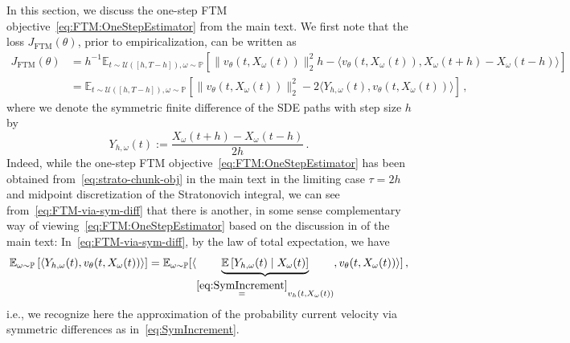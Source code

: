 \documentclass[oneside,11pt]{article}
\theoremstyle{remark}
\begin{document}
In this section, we discuss the one-step FTM objective~\eqref{eq:FTM:OneStepEstimator} from the main text. We first note that the loss $J_{\text{FTM}}(\theta)$, prior to empiricalization, can be written as
\begin{align}
    J_{\text{FTM}}(\theta) &= h^{-1} \mathbb{E}_{t \sim \mathcal{U}([h, T-h]), \omega \sim \mathbb{P}} \left[\|v_{\theta}(t, X_\omega(t))\|_2^2 h - \langle v_{\theta}(t,X_\omega(t)), X_\omega(t+h) - X_\omega(t-h)\rangle \right] \nonumber\\
    &= \mathbb{E}_{t \sim \mathcal{U}([h, T-h]), \omega \sim \mathbb{P}} \left[\|v_{\theta}(t, X_\omega(t))\|^2_2 - 2 \langle Y_{h,\omega}(t) , v_{\theta}(t, X_\omega(t))\rangle\right]\,,
    \label{eq:FTM-via-sym-diff}
\end{align}
where we denote the symmetric finite difference of the SDE paths with step size $h$ by
\begin{equation*}
  Y_{h,\omega}(t) := \frac{X_\omega(t+h) - X_\omega(t-h)}{2h}\,. 
\end{equation*} 
Indeed, while the one-step FTM objective~\eqref{eq:FTM:OneStepEstimator} has been obtained from~\eqref{eq:strato-chunk-obj} in the main text in the limiting case $\tau = 2h$ and midpoint discretization of the Stratonovich integral, we can see from~\eqref{eq:FTM-via-sym-diff} that there is another, in some sense complementary way of viewing~\eqref{eq:FTM:OneStepEstimator} based on the discussion in  of the main text: In~\eqref{eq:FTM-via-sym-diff}, by the law of total expectation, we have
\begin{align*}
    \mathbb{E}_{\omega \sim \mathbb{P}} \left[ \langle Y_{h,\omega}(t) , v_{\theta}(t, X_\omega(t))\rangle\right] = \mathbb{E}_{\omega \sim \mathbb{P}} [ \langle \underbrace{\mathbb{E} \left[ Y_{h,\omega}(t) \mid X_\omega(t) \right]}_{\overset{\eqref{eq:SymIncrement}}{=}v_h(t,X_\omega(t))} , v_{\theta}(t, X_\omega(t))\rangle]\,,
\end{align*}
i.e., we recognize here the approximation of the probability current velocity via symmetric differences as in~\eqref{eq:SymIncrement}.
\end{document}
